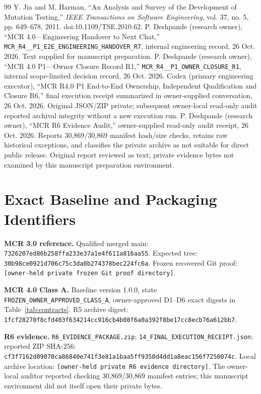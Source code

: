 \documentclass[11pt,twocolumn]{article}
\newcommand{\code}[1]{\texttt{#1}}
\begin{document}
\begin{thebibliography}{99}
 Y. Jia and M. Harman, ``An Analysis and Survey of the Development of Mutation Testing,'' \emph{IEEE Transactions on Software Engineering}, vol. 37, no. 5, pp. 649--678, 2011. doi:10.1109/TSE.2010.62.
 P. Deshpande (research owner), ``MCR 4.0---Engineering Handover to Next Chat,'' \code{MCR\_\allowbreak R4\_\_\allowbreak P1\_\allowbreak E2E\_\allowbreak ENGINEERING\_\allowbreak HANDOVER\_\allowbreak R7}, internal engineering record, 26 Oct. 2026. Text supplied for manuscript preparation.
 P. Deshpande (research owner), ``MCR 4.0 P1---Owner Closure Record R1,'' \code{MCR\_\allowbreak R4\_\_\allowbreak P1\_\allowbreak OWNER\_\allowbreak CLOSURE\_\allowbreak R1}, internal scope-limited decision record, 26 Oct. 2026.
 Codex (primary engineering executor), ``MCR R4.0 P1 End-to-End Ownership, Independent Qualification and Closure R6,'' final execution receipt summarized in owner-supplied conversation, 26 Oct. 2026. Original JSON/ZIP private; subsequent owner-local read-only audit reported archival integrity without a new execution run.
 P. Deshpande (research owner), ``MCR R6 Evidence Audit,'' owner-supplied read-only audit receipt, 26 Oct. 2026. Reports 30,869/30,869 manifest hash/size checks, retains raw historical exceptions, and classifies the private archive as not suitable for direct public release. Original report reviewed as text; private evidence bytes not examined by this manuscript preparation environment.
\end{thebibliography}

\appendix
\small
\section{Exact Baseline and Packaging Identifiers}
\noindent\textbf{MCR 3.0 reference.} Qualified merged main: \texttt{7326207ed86b\allowbreak 258ffa233e37\allowbreak a1e4f611a816\allowbreak aa55}. Expected tree: \texttt{30b98ce0921d\allowbreak 706c75c3da0b\allowbreak 274378bec224\allowbreak fc6a}. Frozen recovered Git proof: \code{[owner-held private frozen Git proof directory]}.\par
\noindent\textbf{MCR 4.0 Class A.} Baseline version 1.0.0, state \code{FROZEN\_\allowbreak OWNER\_\allowbreak APPROVED\_\allowbreak CLASS\_\allowbreak A}, owner-approved D1--D6 exact digests in Table~\ref{tab:contracts}. R5 archive digest: \texttt{1fcf28270f8c\allowbreak fd403f634214\allowbreak cc916cb4b08f\allowbreak 6a0a392f8be1\allowbreak 7cc8ecb76a61\allowbreak 2bb7}.\par
\noindent\textbf{R6 evidence.} \code{R6\_\allowbreak EVIDENCE\_\allowbreak PACKAGE.zip}; \code{14\_\allowbreak FINAL\_\allowbreak EXECUTION\_\allowbreak RECEIPT.json}; reported ZIP SHA-256: \texttt{cf3f7162d090\allowbreak 70ca86840e74\allowbreak 1f3e81a1baa5\allowbreak ff9350d4dd1a\allowbreak 8eac156f7250\allowbreak 074c}. Local archive location: \code{[owner-held private R6 evidence directory]}. The owner-local auditor reported checking 30,869/30,869 manifest entries; this manuscript environment did not itself open their private bytes.
\end{document}
